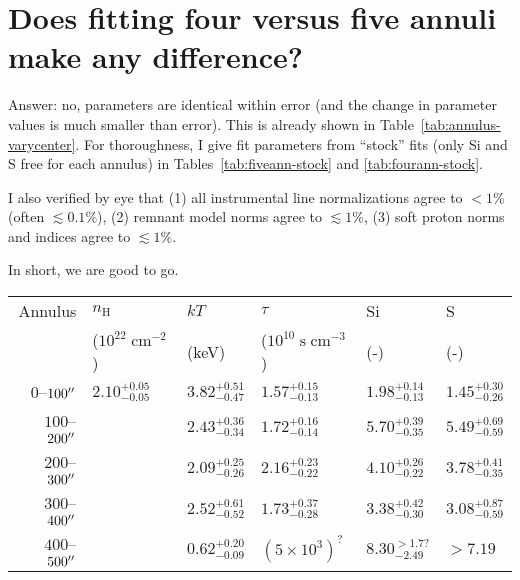 \documentclass[preprint2,tighten,trackchanges]{aastex6}
\newcommand*{\mt}{\mathrm}
\newcommand*{\unit}[1]{\;\mt{#1}}  %
\begin{document}
\section{Does fitting four versus five annuli make any difference?}

Answer: no, parameters are identical within error (and the change in parameter
values is much smaller than error).
This is already shown in Table~\ref{tab:annulus-varycenter}.
For thoroughness, I give fit parameters from ``stock'' fits (only Si and S
free for each annulus) in Tables~\ref{tab:fiveann-stock} and
\ref{tab:fourann-stock}.

I also verified by eye that
(1) all instrumental line normalizations agree to $<1\%$ (often $\lesssim0.1\%$),
(2) remnant model norms agree to $\lesssim 1$\%,
(3) soft proton norms and indices agree to $\lesssim 1\%$.

In short, we are good to go.

\begin{table*}
    \centering
    \caption{Five annulus fit \label{tab:fiveann-stock}}
    \begin{tabular}{@{}rlllll@{}}
        \toprule
        Annulus & $n_\mathrm{H}$ & $kT$ & $\tau$ & Si & S \\
         & ($10^{22} \unit{cm^{-2}}$) & (keV) & ($10^{10} \unit{s\;cm^{-3}}$) & (-) & (-) \\
        \midrule
        $0$--$100\mbox{$^{\prime\prime}$}$   & ${2.10}^{+0.05}_{-0.05}$ & ${3.82}^{+0.51}_{-0.47}$ & ${1.57}^{+0.15}_{-0.13}$ & ${1.98}^{+0.14}_{-0.13}$ & ${1.45}^{+0.30}_{-0.26}$ \\
        $100$--$200\mbox{$^{\prime\prime}$}$ &                          & ${2.43}^{+0.36}_{-0.34}$ & ${1.72}^{+0.16}_{-0.14}$ & ${5.70}^{+0.39}_{-0.35}$ & ${5.49}^{+0.69}_{-0.59}$ \\
        $200$--$300\mbox{$^{\prime\prime}$}$ &                          & ${2.09}^{+0.25}_{-0.26}$ & ${2.16}^{+0.23}_{-0.22}$ & ${4.10}^{+0.26}_{-0.22}$ & ${3.78}^{+0.41}_{-0.35}$ \\
        $300$--$400\mbox{$^{\prime\prime}$}$ &                          & ${2.52}^{+0.61}_{-0.52}$ & ${1.73}^{+0.37}_{-0.28}$ & ${3.38}^{+0.42}_{-0.30}$ & ${3.08}^{+0.87}_{-0.59}$ \\
        $400$--$500\mbox{$^{\prime\prime}$}$ &                          & ${0.62}^{+0.20}_{-0.09}$ & ${\left(5 \times 10^3\right)}^{?}$                  & ${8.30}^{>1.7?}_{-2.49}$ & $>7.19$ \\
        \bottomrule
    \end{tabular}
\end{table*}
\end{document}

